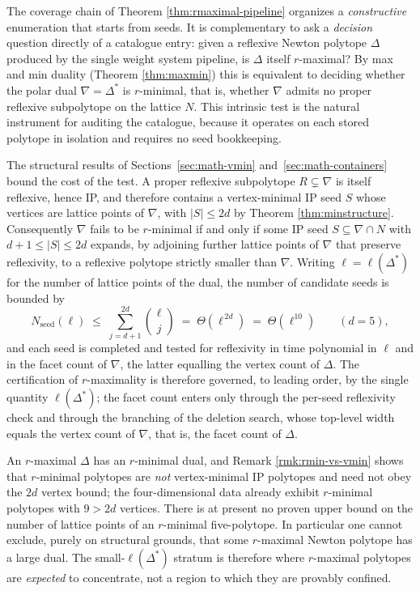 \documentclass[appliedmath,article,submit,moreauthors]{Definitions/mdpi}
\begin{document}
The coverage chain of Theorem \ref{thm:rmaximal-pipeline} organizes a
\emph{constructive} enumeration that starts from seeds. It is complementary to
ask a \emph{decision} question directly of a catalogue entry: given a reflexive
Newton polytope \(\Delta\) produced by the single weight system pipeline, is
\(\Delta\) itself \(r\)-maximal? By max and min duality (Theorem \ref{thm:maxmin}) this
is equivalent to deciding whether the polar dual \(\nabla=\Delta^*\) is
\(r\)-minimal, that is, whether \(\nabla\) admits no proper reflexive
subpolytope on the lattice \(N\). This intrinsic test is the natural instrument
for auditing the catalogue, because it operates on each stored polytope in
isolation and requires no seed bookkeeping.

The structural results of Sections~\ref{sec:math-vmin} and~\ref{sec:math-containers} bound the
cost of the test. A proper reflexive subpolytope \(R\subsetneq\nabla\) is itself
reflexive, hence IP, and therefore contains a vertex-minimal IP seed \(S\) whose
vertices are lattice points of \(\nabla\), with \(|S|\leq 2d\) by Theorem
\ref{thm:minstructure}. Consequently \(\nabla\) fails to be \(r\)-minimal if
and only if some IP seed \(S\subseteq\nabla\cap N\) with \(d+1\leq|S|\leq2d\)
expands, by adjoining further lattice points of \(\nabla\) that preserve
reflexivity, to a reflexive polytope strictly smaller than \(\nabla\). Writing
\(\ell=\ell(\Delta^*)\) for the number of lattice points of the dual, the number
of candidate seeds is bounded by
\[
    N_{\mathrm{seed}}(\ell)\;\leq\;\sum_{j=d+1}^{2d}\binom{\ell}{j}\;=\;\Theta\!\left(\ell^{\,2d}\right)\;=\;\Theta\!\left(\ell^{10}\right)\qquad(d=5),
\]
and each seed is completed and tested for reflexivity in time polynomial in
\(\ell\) and in the facet count of \(\nabla\), the latter equalling the vertex
count of \(\Delta\). The certification of \(r\)-maximality is therefore
governed, to leading order, by the single quantity \(\ell(\Delta^*)\); the facet
count enters only through the per-seed reflexivity check and through the
branching of the deletion search, whose top-level width equals the vertex count
of \(\nabla\), that is, the facet count of \(\Delta\).

\begin{Remark}
\label{rmk:no-ell-bound}
An \(r\)-maximal \(\Delta\) has an \(r\)-minimal dual, and
Remark \ref{rmk:rmin-vs-vmin} shows that \(r\)-minimal polytopes are \emph{not}
vertex-minimal IP polytopes and need not obey the \(2d\) vertex bound; the
four-dimensional data already exhibit \(r\)-minimal polytopes with \(9>2d\)
vertices. There is at present no proven upper bound on the number of lattice
points of an \(r\)-minimal five-polytope. In particular one cannot exclude,
purely on structural grounds, that some \(r\)-maximal Newton polytope has a
large dual. The small-\(\ell(\Delta^*)\) stratum is therefore where
\(r\)-maximal polytopes are \emph{expected} to concentrate, not a region to
which they are provably confined.
\end{Remark}
\end{document}
